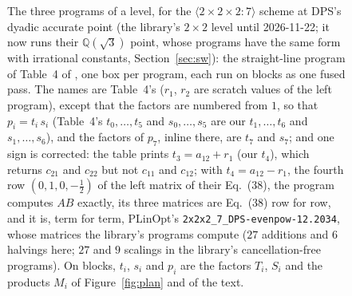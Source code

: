 \documentclass[11pt]{article}
\newcommand{\mm}[1]{\langle #1\rangle}
\begin{document}
\begin{figure}[!tbp]
\caption{The three programs of a level, for the $\mm{2\times2\times2:7}$ scheme at
DPS's dyadic accurate point (the library's $2\times2$ level until
2026-11-22; it now runs their $\mathbb{Q}(\sqrt3)$ point, whose programs
have the same form with irrational constants, Section~\ref{sec:sw}): the straight-line
program of Table~4 of \cite{DPS24}, one box per program, each run on blocks
as one fused pass.  The names are Table~4's ($r_1$, $r_2$ are scratch values of the left program),
except that the factors are numbered from $1$, so that $p_i = t_i\,s_i$
(Table~4's $t_0,\dots,t_5$ and $s_0,\dots,s_5$ are our $t_1,\dots,t_6$ and
$s_1,\dots,s_6$), and the factors of $p_7$, inline there, are $t_7$ and
$s_7$; and one sign is corrected: the table prints $t_3 =
a_{12}+r_1$ (our $t_4$), which returns $c_{21}$ and $c_{22}$ but not $c_{11}$ and
$c_{12}$; with $t_4 = a_{12}-r_1$, the fourth row $(0,1,0,-\frac12)$ of the
left matrix of their Eq.~(38), the program computes $AB$ exactly, its three
matrices are Eq.~(38) row for row, and it is, term for term, PLinOpt's
\texttt{2x2x2\_7\_DPS-evenpow-12.2034}, whose matrices the library's programs
compute ($27$ additions and $6$ halvings here; $27$ and $9$ scalings in the library's cancellation-free programs).  On blocks, $t_i$, $s_i$ and $p_i$ are the factors $T_i$, $S_i$ and the products $M_i$ of Figure~\ref{fig:plan} and of the text.}
\label{fig:lrp}
\end{figure}
\end{document}

